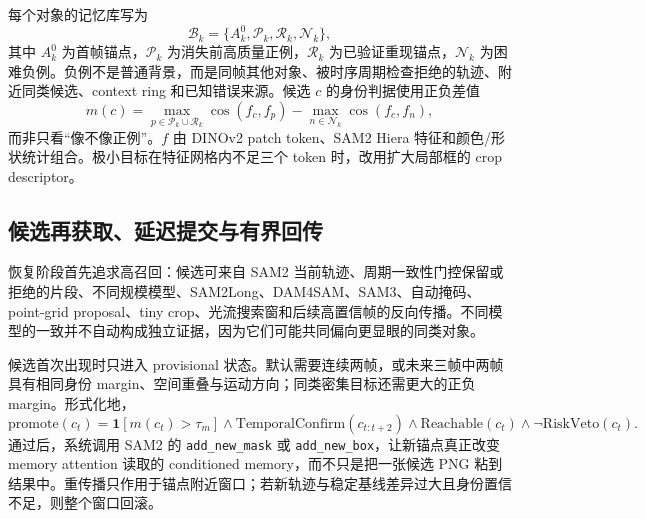 \documentclass[11pt,a4paper,oneside]{ctexart}
\newcommand{\code}[1]{\texttt{#1}}
\begin{document}
每个对象的记忆库写为
\begin{equation}
\mathcal B_k=\{A_k^0,\mathcal P_k,\mathcal R_k,\mathcal N_k\},
\end{equation}
其中 $A_k^0$ 为首帧锚点，$\mathcal P_k$ 为消失前高质量正例，$\mathcal R_k$ 为已验证重现锚点，$\mathcal N_k$ 为困难负例。负例不是普通背景，而是同帧其他对象、被时序周期检查拒绝的轨迹、附近同类候选、context ring 和已知错误来源。候选 $c$ 的身份判据使用正负差值
\begin{equation}
m(c)=\max_{p\in\mathcal P_k\cup\mathcal R_k}\cos(f_c,f_p)-\max_{n\in\mathcal N_k}\cos(f_c,f_n),
\label{eq:margin}
\end{equation}
而非只看“像不像正例”。$f$ 由 DINOv2 patch token\cite{oquab2024dinov2}、SAM2 Hiera 特征和颜色/形状统计组合。极小目标在特征网格内不足三个 token 时，改用扩大局部框的 crop descriptor。

\subsection{候选再获取、延迟提交与有界回传}
恢复阶段首先追求高召回：候选可来自 SAM2 当前轨迹、周期一致性门控保留或拒绝的片段、不同规模模型、SAM2Long、DAM4SAM、SAM3、自动掩码、point-grid proposal、tiny crop、光流搜索窗和后续高置信帧的反向传播。不同模型的一致并不自动构成独立证据，因为它们可能共同偏向更显眼的同类对象。

候选首次出现时只进入 provisional 状态。默认需要连续两帧，或未来三帧中两帧具有相同身份 margin、空间重叠与运动方向；同类密集目标还需更大的正负 margin。形式化地，
\begin{equation}
\mathrm{promote}(c_t)=\mathbf1[m(c_t)>\tau_m]\land
\mathrm{TemporalConfirm}(c_{t:t+2})\land
\mathrm{Reachable}(c_t)\land\neg\mathrm{RiskVeto}(c_t).
\end{equation}
通过后，系统调用 SAM2 的 \code{add\_new\_mask} 或 \code{add\_new\_box}，让新锚点真正改变 memory attention 读取的 conditioned memory，而不只是把一张候选 PNG 粘到结果中。重传播只作用于锚点附近窗口；若新轨迹与稳定基线差异过大且身份置信不足，则整个窗口回滚。
\end{document}
